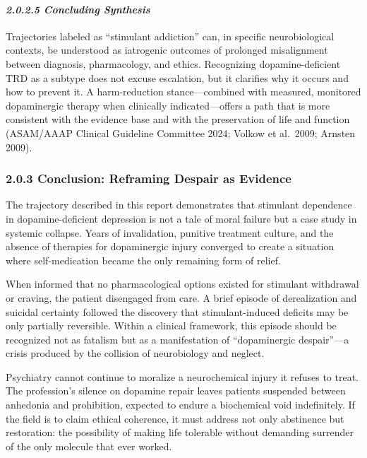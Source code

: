 \paragraph{\texorpdfstring{\emph{2.0.2.5 Concluding Synthesis}}{2.0.2.5 Concluding Synthesis}}\label{10b_traad-concluding-synthesis}

Trajectories labeled as ``stimulant addiction'' can, in specific neurobiological contexts, be understood as iatrogenic outcomes of prolonged misalignment between diagnosis, pharmacology, and ethics. Recognizing dopamine-deficient TRD as a subtype does not excuse escalation, but it clarifies why it occurs and how to prevent it. A harm-reduction stance---combined with measured, monitored dopaminergic therapy when clinically indicated---offers a path that is more consistent with the evidence base and with the preservation of life and function (ASAM/AAAP Clinical Guideline Committee 2024; Volkow et al.~2009; Arnsten 2009).

\subsubsection{2.0.3 Conclusion: Reframing Despair as Evidence}\label{10b_traad-conclusion-reframing-despair-as-evidence}

The trajectory described in this report demonstrates that stimulant dependence in dopamine-deficient depression is not a tale of moral failure but a case study in systemic collapse. Years of invalidation, punitive treatment culture, and the absence of therapies for dopaminergic injury converged to create a situation where self-medication became the only remaining form of relief.

When informed that no pharmacological options existed for stimulant withdrawal or craving, the patient disengaged from care. A brief episode of derealization and suicidal certainty followed the discovery that stimulant-induced deficits may be only partially reversible. Within a clinical framework, this episode should be recognized not as fatalism but as a manifestation of ``dopaminergic despair''---a crisis produced by the collision of neurobiology and neglect.

Psychiatry cannot continue to moralize a neurochemical injury it refuses to treat. The profession's silence on dopamine repair leaves patients suspended between anhedonia and prohibition, expected to endure a biochemical void indefinitely. If the field is to claim ethical coherence, it must address not only abstinence but restoration: the possibility of making life tolerable without demanding surrender of the only molecule that ever worked.

